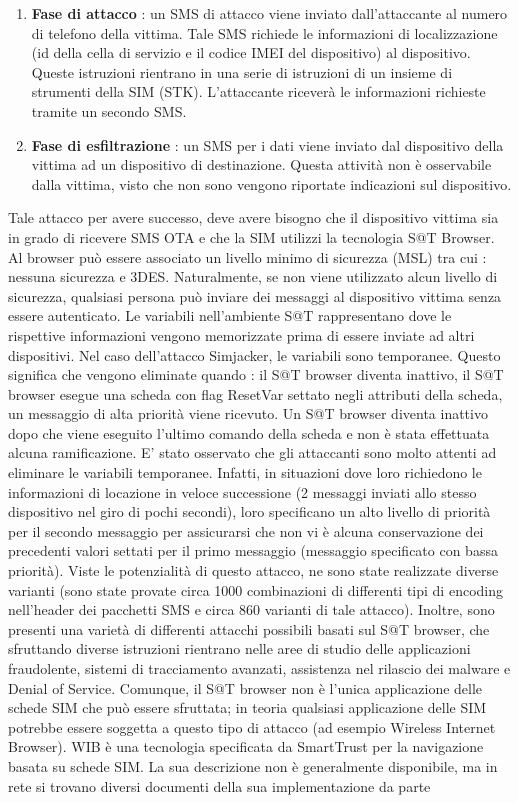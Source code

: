 \documentclass[12pt]{report}
\begin{document}
\begin{appendix}
\begin{enumerate}
\item \textbf{Fase di attacco} : un SMS di attacco viene inviato dall'attaccante al numero di telefono della vittima. Tale SMS richiede le informazioni di localizzazione (id della cella di servizio e il codice IMEI del dispositivo) al dispositivo. Queste istruzioni rientrano in una serie di istruzioni di un insieme di strumenti della SIM (STK). L'attaccante riceverà le informazioni richieste tramite un secondo SMS.
\item \textbf{Fase di esfiltrazione} : un SMS per i dati viene inviato dal dispositivo della vittima ad un dispositivo di destinazione. Questa attività non è osservabile dalla vittima, visto che non sono vengono riportate indicazioni sul dispositivo.
\end{enumerate}
Tale attacco per avere successo, deve avere bisogno che il dispositivo vittima sia in grado di ricevere SMS OTA e che la SIM utilizzi la tecnologia S@T Browser. Al browser può essere associato un livello minimo di sicurezza (MSL) tra cui : nessuna sicurezza e 3DES. Naturalmente, se non viene utilizzato alcun livello di sicurezza, qualsiasi persona può inviare dei messaggi al dispositivo vittima senza essere autenticato. Le variabili nell'ambiente S@T rappresentano dove le rispettive informazioni vengono memorizzate prima di essere inviate ad altri dispositivi. Nel caso dell'attacco Simjacker, le variabili sono temporanee. Questo significa che vengono eliminate quando : il S@T browser diventa inattivo, il S@T browser esegue una scheda con flag ResetVar settato negli attributi della scheda, un messaggio di alta priorità viene ricevuto. Un S@T browser diventa inattivo dopo che viene eseguito l'ultimo comando della scheda e non è stata effettuata alcuna ramificazione. E' stato osservato che gli attaccanti sono molto attenti ad eliminare le variabili temporanee. Infatti, in situazioni dove loro richiedono le informazioni di locazione in veloce successione (2 messaggi inviati allo stesso dispositivo nel giro di pochi secondi), loro specificano un alto livello di priorità per il secondo messaggio per assicurarsi che non vi è alcuna conservazione dei precedenti valori settati per il primo messaggio (messaggio specificato con bassa priorità). Viste le potenzialità di questo attacco, ne sono state realizzate diverse varianti (sono state provate circa 1000 combinazioni di differenti tipi di encoding nell'header dei pacchetti SMS e circa 860 varianti di tale attacco). Inoltre, sono presenti una varietà di differenti attacchi possibili basati sul S@T browser, che sfruttando diverse istruzioni rientrano nelle aree di studio delle applicazioni fraudolente, sistemi di tracciamento avanzati, assistenza nel rilascio dei malware e Denial of Service. Comunque, il S@T browser non è l'unica applicazione delle schede SIM che può essere sfruttata; in teoria qualsiasi applicazione delle SIM potrebbe essere soggetta a questo tipo di attacco (ad esempio Wireless Internet Browser). WIB è una tecnologia specificata da SmartTrust per la navigazione basata su schede SIM. La sua descrizione non è generalmente disponibile, ma in rete si trovano diversi documenti della sua implementazione da parte 
\end{appendix}
\end{document}
